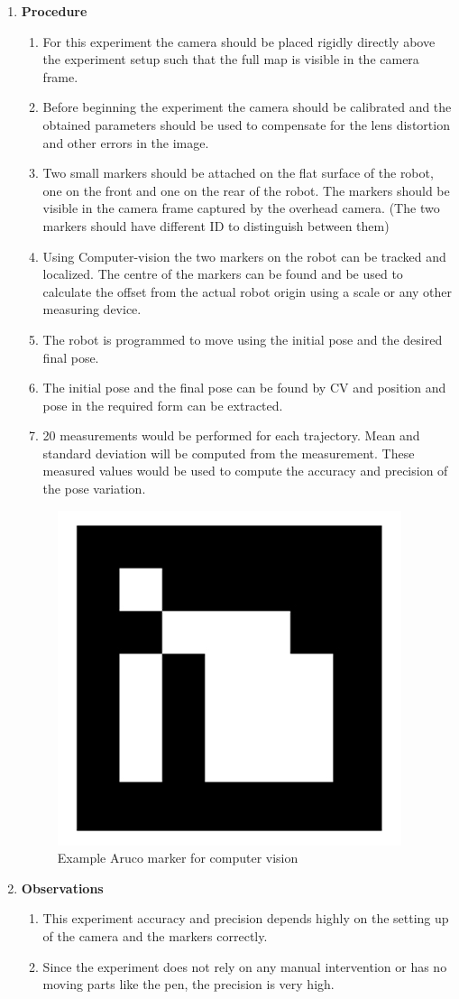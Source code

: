 \documentclass[10pt,a4paper]{article}
\begin{document}
\begin{enumerate}[label=\Roman*]
\vspace{0.5cm}
\newpage
\item
\Large{\textbf{Procedure}}\\

\begin{enumerate}
	\item
	For this experiment the camera should be placed rigidly directly above the experiment setup such that the full map is visible in the camera frame. 
	\item
	Before beginning the experiment the camera should be calibrated and the obtained parameters should be used to compensate for the lens distortion and other errors in the image. 
	\item
	Two small markers should be attached on the flat surface of the robot, one on the front and one on the rear of the robot. The markers should be visible in the camera frame captured by the overhead camera. (The two markers should have different ID to distinguish between them)
	\item
    Using Computer-vision the two markers on the robot can be tracked and localized. The centre of the markers can be found and be used to calculate the offset from the actual robot origin using a scale or any other measuring device.
	\item
	The robot is programmed to move using the initial pose and the desired final pose.
	\item
	The initial pose and the final pose can be found by CV and position and pose in the required form can be extracted.
	\item
	20 measurements would be performed for each trajectory. Mean and standard deviation will be computed from the measurement. These measured values would be used to compute the accuracy and precision of the pose variation. 
\end{enumerate}
\vspace{0.5cm}

\begin{figure}[h]
	\centering
\includegraphics[width=0.2\linewidth ]{marker.png}
\caption{ Example Aruco marker for computer vision}
\end{figure}


\item
\textbf{Observations}\\
\begin{enumerate}
	\item
	This experiment accuracy and precision depends highly on the setting up of the camera and the markers correctly.
	\item
	Since the experiment does not rely on any manual intervention or has no moving parts like the pen, the precision is very high.
\end{enumerate}
\vspace{0.5cm}


\end{enumerate}
\end{document}

